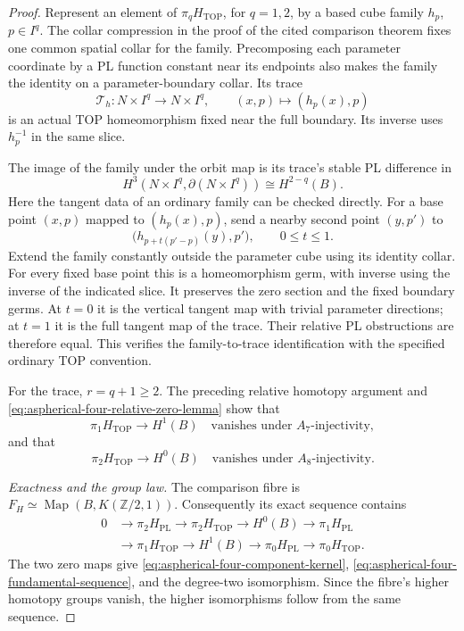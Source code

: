 \begin{proof}
Represent an element of $\pi_qH_{\mathrm{TOP}}$, for
$q=1,2$, by a based cube family $h_p$, $p\in I^q$.
The collar compression in the proof of the cited
comparison theorem fixes one common spatial collar
for the family.  Precomposing each parameter coordinate
by a PL function constant near its endpoints also
makes the family the identity on a parameter-boundary
collar.  Its trace
\begin{equation}\label{eq:aspherical-four-family-trace}
 \mathcal T_h:N\times I^q\longrightarrow N\times I^q,
 \qquad (x,p)\longmapsto(h_p(x),p)
\end{equation}
is an actual TOP homeomorphism fixed near the full
boundary.  Its inverse uses $h_p^{-1}$ in the same slice.

The image of the family under the orbit map is its
trace's stable PL difference in
\[
 H^3(N\times I^q,\partial(N\times I^q))
                 \cong H^{2-q}(B).
\]
Here the tangent data of an ordinary family can be
checked directly.  For a base point $(x,p)$ mapped
to $(h_p(x),p)$, send a nearby second point $(y,p')$ to
\[
 \bigl(h_{p+t(p'-p)}(y),p'\bigr),\qquad 0\leq t\leq1.
\]
Extend the family constantly outside the parameter
cube using its identity collar.  For every fixed base
point this is a homeomorphism germ, with inverse using
the inverse of the indicated slice.  It preserves
the zero section and the fixed boundary germs.
At $t=0$ it is the vertical tangent map with trivial
parameter directions; at $t=1$ it is the full tangent
map of the trace.  Their relative PL obstructions are
therefore equal.  This verifies the family-to-trace
identification with the specified ordinary TOP convention.

For the trace, $r=q+1\geq2$.  The preceding relative
homotopy argument and
\eqref{eq:aspherical-four-relative-zero-lemma} show that
\[
 \pi_1H_{\mathrm{TOP}}\longrightarrow H^1(B)
 \quad\text{vanishes under }A_7\text{-injectivity},
\]
and that
\[
 \pi_2H_{\mathrm{TOP}}\longrightarrow H^0(B)
 \quad\text{vanishes under }A_8\text{-injectivity}.
\]

\emph{Exactness and the group law.}
The comparison fibre is
$F_H\simeq\operatorname{Map}(B,K(\mathbb Z/2,1))$.
Consequently its exact sequence contains
\begin{equation}\label{eq:aspherical-four-relative-long-sequence}
\begin{aligned}
0&\longrightarrow\pi_2H_{\mathrm{PL}}
 \longrightarrow\pi_2H_{\mathrm{TOP}}
 \longrightarrow H^0(B)
 \longrightarrow\pi_1H_{\mathrm{PL}}\\
 &\longrightarrow\pi_1H_{\mathrm{TOP}}
 \longrightarrow H^1(B)
 \longrightarrow\pi_0H_{\mathrm{PL}}
 \longrightarrow\pi_0H_{\mathrm{TOP}}.
\end{aligned}
\end{equation}
The two zero maps give
\eqref{eq:aspherical-four-component-kernel},
\eqref{eq:aspherical-four-fundamental-sequence}, and
the degree-two isomorphism.  Since the fibre's higher
homotopy groups vanish, the higher isomorphisms follow
from the same sequence.


\end{proof}
